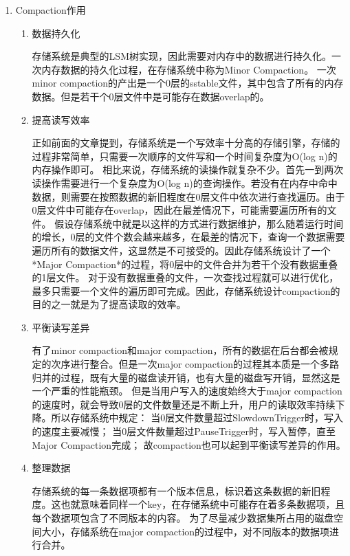 		\begin{enumerate}
			\item Compaction作用
			\begin{enumerate}
				\item 数据持久化

				存储系统是典型的LSM树实现，因此需要对内存中的数据进行持久化。一次内存数据的持久化过程，在存储系统中称为Minor Compaction。
				一次minor compaction的产出是一个0层的sstable文件，其中包含了所有的内存数据。但是若干个0层文件中是可能存在数据overlap的。
				
				\item 提高读写效率
				
				正如前面的文章提到，存储系统是一个写效率十分高的存储引擎，存储的过程非常简单，只需要一次顺序的文件写和一个时间复杂度为O(log n)的内存操作即可。
				相比来说，存储系统的读操作就复杂不少。首先一到两次读操作需要进行一个复杂度为O(log n)的查询操作。若没有在内存中命中数据，则需要在按照数据的新旧程度在0层文件中依次进行查找遍历。由于0层文件中可能存在overlap，因此在最差情况下，可能需要遍历所有的文件。
				假设存储系统中就是以这样的方式进行数据维护，那么随着运行时间的增长，0层的文件个数会越来越多，在最差的情况下，查询一个数据需要遍历所有的数据文件，这显然是不可接受的。因此存储系统设计了一个*Major Compaction*的过程，将0层中的文件合并为若干个没有数据重叠的1层文件。
				对于没有数据重叠的文件，一次查找过程就可以进行优化，最多只需要一个文件的遍历即可完成。因此，存储系统设计compaction的目的之一就是为了提高读取的效率。
				
				\item 平衡读写差异
				
				有了minor compaction和major compaction，所有的数据在后台都会被规定的次序进行整合。但是一次major compaction的过程其本质是一个多路归并的过程，既有大量的磁盘读开销，也有大量的磁盘写开销，显然这是一个严重的性能瓶颈。
				但是当用户写入的速度始终大于major compaction的速度时，就会导致0层的文件数量还是不断上升，用户的读取效率持续下降。所以存储系统中规定：
				当0层文件数量超过SlowdownTrigger时，写入的速度主要减慢；
				当0层文件数量超过PauseTrigger时，写入暂停，直至Major Compaction完成；
				故compaction也可以起到平衡读写差异的作用。
				
				\item 整理数据
				
				存储系统的每一条数据项都有一个版本信息，标识着这条数据的新旧程度。这也就意味着同样一个key，在存储系统中可能存在着多条数据项，且每个数据项包含了不同版本的内容。
				为了尽量减少数据集所占用的磁盘空间大小，存储系统在major compaction的过程中，对不同版本的数据项进行合并。
				

\end{enumerate}
\end{enumerate}

